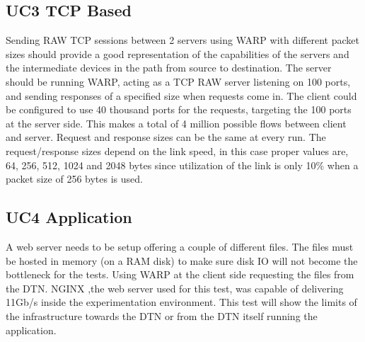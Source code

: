\subsection{UC3 TCP Based}
Sending RAW TCP sessions between 2 servers using WARP with different packet sizes should provide a good representation of the capabilities of the servers and the intermediate devices in the path from source to destination. 
The server should be running WARP, acting as a TCP RAW server listening on 100 ports, and sending responses of a specified size when requests come in. The client could be configured to use 40 thousand ports for the requests, targeting the 100 ports at the server side. This makes a total of 4 million possible flows between client and server. Request and response sizes can be the same at every run. The request/response sizes depend on the link speed, in this case proper values are, 64, 256, 512, 1024 and 2048 bytes since utilization of the link is only 10\% when a packet size of 256 bytes is used.  

\subsection{UC4 Application}
A web server needs to be setup offering a couple of different files. The files must be hosted in memory (on a RAM disk) to make sure disk IO will not become the bottleneck for the tests. Using WARP at the client side requesting the files from the DTN. NGINX\cite{nginx} ,the web server used for this test, was capable of delivering 11Gb/s inside the experimentation environment. This test will show the limits of the infrastructure towards the DTN or from the DTN itself running the application. 

\


 










